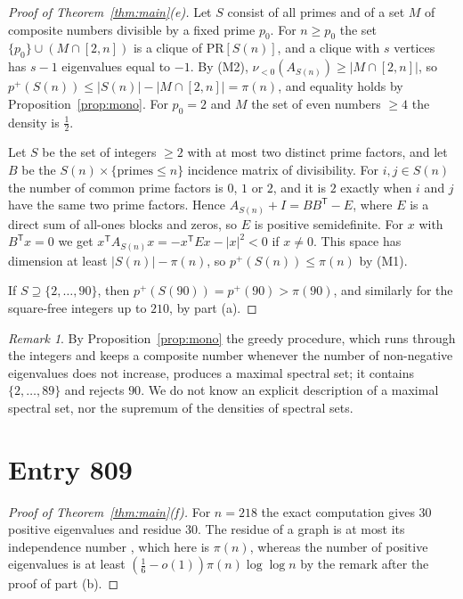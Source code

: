 \documentclass[11pt]{amsart}
\theoremstyle{definition}
\theoremstyle{remark}
\newtheorem{remark}[theorem]{Remark}
\newcommand{\PR}{\mathrm{PR}}
\newcommand{\pp}{p^{+}}
\begin{document}
\begin{proof}[Proof of Theorem~\ref{thm:main}(e)]
Let $S$ consist of all primes and of a set $M$ of composite numbers divisible by a fixed prime $p_0$. For $n\ge p_0$ the set $\{p_0\}\cup(M\cap[2,n])$ is a clique of $\PR[S(n)]$, and a clique with $s$ vertices has $s-1$ eigenvalues equal to $-1$. By (M2), $\nu_{<0}(A_{S(n)})\ge|M\cap[2,n]|$, so $\pp(S(n))\le|S(n)|-|M\cap[2,n]|=\pi(n)$, and equality holds by Proposition~\ref{prop:mono}. For $p_0=2$ and $M$ the set of even numbers $\ge4$ the density is $\tfrac12$.

Let $S$ be the set of integers $\ge2$ with at most two distinct prime factors, and let $B$ be the $S(n)\times\{\text{primes}\le n\}$ incidence matrix of divisibility. For $i,j\in S(n)$ the number of common prime factors is $0$, $1$ or $2$, and it is $2$ exactly when $i$ and $j$ have the same two prime factors. Hence $A_{S(n)}+I=BB^{\mathsf T}-E$, where $E$ is a direct sum of all-ones blocks and zeros, so $E$ is positive semidefinite. For $x$ with $B^{\mathsf T}x=0$ we get $x^{\mathsf T}A_{S(n)}x=-x^{\mathsf T}Ex-|x|^2<0$ if $x\ne0$. This space has dimension at least $|S(n)|-\pi(n)$, so $\pp(S(n))\le\pi(n)$ by (M1).

If $S\supseteq\{2,\dots,90\}$, then $\pp(S(90))=\pp(90)>\pi(90)$, and similarly for the square-free integers up to $210$, by part (a).
\end{proof}

\begin{remark}
By Proposition~\ref{prop:mono} the greedy procedure, which runs through the integers and keeps a composite number whenever the number of non-negative eigenvalues does not increase, produces a maximal spectral set; it contains $\{2,\dots,89\}$ and rejects $90$. We do not know an explicit description of a maximal spectral set, nor the supremum of the densities of spectral sets.
\end{remark}

\section{Entry 809}

\begin{proof}[Proof of Theorem~\ref{thm:main}(f)]
For $n=218$ the exact computation gives $30$ positive eigenvalues and residue $30$. The residue of a graph is at most its independence number \cite{FMS}, which here is $\pi(n)$, whereas the number of positive eigenvalues is at least $(\tfrac16-o(1))\pi(n)\log\log n$ by the remark after the proof of part (b).
\end{proof}
\end{document}

